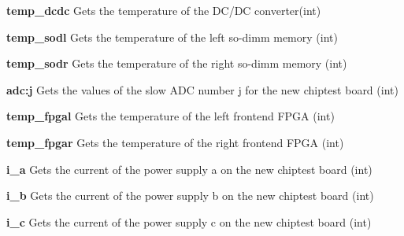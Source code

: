 \begin{DoxyItemize}
\item {\bfseries temp\_\-dcdc} Gets the temperature of the DC/DC converter(int)
\end{DoxyItemize}


\begin{DoxyItemize}
\item {\bfseries temp\_\-sodl} Gets the temperature of the left so-\/dimm memory (int)
\end{DoxyItemize}


\begin{DoxyItemize}
\item {\bfseries temp\_\-sodr} Gets the temperature of the right so-\/dimm memory (int)
\end{DoxyItemize}


\begin{DoxyItemize}
\item {\bfseries adc:j} Gets the values of the slow ADC number j for the new chiptest board (int)
\end{DoxyItemize}


\begin{DoxyItemize}
\item {\bfseries temp\_\-fpgal} Gets the temperature of the left frontend FPGA (int)
\end{DoxyItemize}


\begin{DoxyItemize}
\item {\bfseries temp\_\-fpgar} Gets the temperature of the right frontend FPGA (int)
\end{DoxyItemize}


\begin{DoxyItemize}
\item {\bfseries i\_\-a} Gets the current of the power supply a on the new chiptest board (int)
\end{DoxyItemize}


\begin{DoxyItemize}
\item {\bfseries i\_\-b} Gets the current of the power supply b on the new chiptest board (int)
\end{DoxyItemize}


\begin{DoxyItemize}
\item {\bfseries i\_\-c} Gets the current of the power supply c on the new chiptest board (int)
\end{DoxyItemize}


